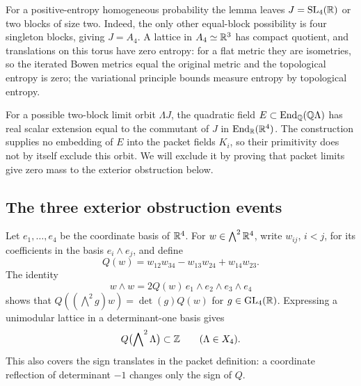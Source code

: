 For a positive-entropy homogeneous probability the lemma leaves
\(J=\mathrm{SL}_4(\mathbb R)\) or two blocks of size two.
Indeed, the only other equal-block possibility is four singleton
blocks, giving \(J=A_4\).  A lattice in \(A_4\simeq\mathbb R^3\) has
compact quotient, and translations on this torus have zero entropy:
for a flat metric they are isometries, so the iterated Bowen metrics
equal the original metric and the topological entropy is zero;
the variational principle bounds measure entropy by topological entropy.

For a possible two-block limit orbit \(\Lambda J\), the quadratic field
\(E\subset\operatorname{End}_\mathbb Q(\mathbb Q\Lambda)\) has real scalar extension equal to
the commutant of \(J\) in \(\operatorname{End}_\mathbb R(\mathbb R^4)\).
The construction supplies no embedding of \(E\) into the packet fields
\(K_i\), so their primitivity does not by itself exclude this orbit.
We will exclude it by proving that packet limits give zero mass to the
exterior obstruction below.

\subsection{The three exterior obstruction events}

Let \(e_1,\ldots,e_4\) be the coordinate basis of \(\mathbb R^4\).
For \(w\in\bigwedge^2\mathbb R^4\), write \(w_{ij}\), \(i<j\), for its
coefficients in the basis \(e_i\wedge e_j\), and define
\begin{equation}\label{eq:rig-Q}
 Q(w)=w_{12}w_{34}-w_{13}w_{24}+w_{14}w_{23}.
\end{equation}
The identity
\[
 w\wedge w=2Q(w)\,e_1\wedge e_2\wedge e_3\wedge e_4
\]
shows that
\(Q((\bigwedge^2g)w)=\det(g)Q(w)\) for \(g\in\mathrm{GL}_4(\mathbb R)\).
Expressing a unimodular lattice in a determinant-one basis gives
\begin{equation}\label{eq:rig-Q-integral}
 Q\bigl(\bigwedge\nolimits^2\Lambda\bigr)\subset\mathbb Z
 \qquad(\Lambda\in X_4).
\end{equation}
This also covers the sign translates in the packet definition:
a coordinate reflection of determinant \(-1\) changes only the
sign of \(Q\).

